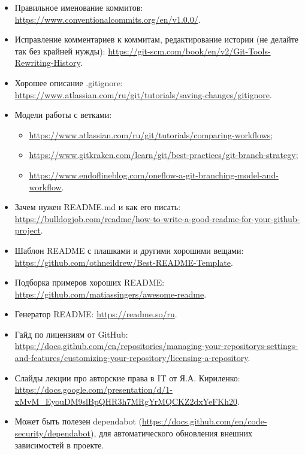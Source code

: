 \documentclass[a5paper]{article}
\begin{document}
\begin{itemize}
    \item Правильное именование коммитов: \url{https://www.conventionalcommits.org/en/v1.0.0/}.
    \item Исправление комментариев к коммитам, редактирование истории (не делайте так без крайней нужды): \url{https://git-scm.com/book/en/v2/Git-Tools-Rewriting-History}.
    \item Хорошее описание .gitignore: \url{https://www.atlassian.com/ru/git/tutorials/saving-changes/gitignore}.
    \item Модели работы с ветками: 
    \begin{itemize}
        \item \url{https://www.atlassian.com/ru/git/tutorials/comparing-workflows};
        \item \url{https://www.gitkraken.com/learn/git/best-practices/git-branch-strategy};
        \item \url{https://www.endoflineblog.com/oneflow-a-git-branching-model-and-workflow}.
    \end{itemize}
    \item Зачем нужен README.md и как его писать: \url{https://bulldogjob.com/readme/how-to-write-a-good-readme-for-your-github-project}.
    \item Шаблон README с плашками и другими хорошими вещами: \url{https://github.com/othneildrew/Best-README-Template}.
    \item Подборка примеров хороших README: \url{https://github.com/matiassingers/awesome-readme}.
    \item Генератор README: \url{https://readme.so/ru}.
    \item Гайд по лицензиям от GitHub: \url{https://docs.github.com/en/repositories/managing-your-repositorys-settings-and-features/customizing-your-repository/licensing-a-repository}.
    \item Слайды лекции про авторские права в IT от Я.А. Кириленко: \url{https://docs.google.com/presentation/d/1-xMvM_EyouDM9slBpQHR3h7MRgYrMQCKZ2dxYeFKh20}.
    \item Может быть полезен dependabot (\url{https://docs.github.com/en/code-security/dependabot}), для автоматического обновления внешних зависимостей в проекте. 
\end{itemize}
\end{document}
